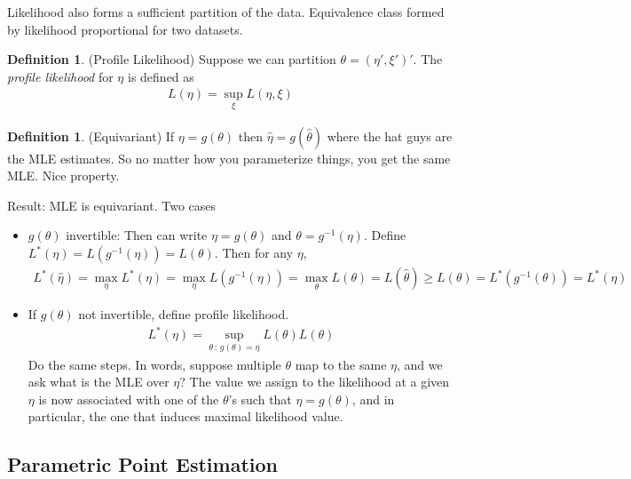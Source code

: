 \documentclass[12pt]{article}
\theoremstyle{plain}
\theoremstyle{definition}
\newtheorem{defn}[thm]{Definition}
\theoremstyle{remark}
\begin{document}
Likelihood also forms a sufficient partition of the data.
Equivalence class formed by likelihood proportional for two datasets.


\begin{defn}
(Profile Likelihood)
Suppose we can partition $\theta=(\eta',\xi')'$.
The \emph{profile likelihood} for $\eta$ is defined as
\begin{align*}
  L(\eta) = \sup_\xi L(\eta,\xi)
\end{align*}
\end{defn}

\begin{defn}(Equivariant)
If $\eta=g(\theta)$ then $\hat{\eta}=g(\hat{\theta})$ where the hat
guys are the MLE estimates.
So no matter how you parameterize things, you get the same MLE. Nice
property.
\end{defn}


Result: MLE is equivariant.
Two cases
\begin{itemize}
  \item $g(\theta)$ invertible:
    Then can write $\eta=g(\theta)$ and $\theta=g^{-1}(\eta)$.
    Define $L^*(\eta)=L(g^{-1}(\eta))=L(\theta)$.
    Then for any $\eta$,
    \begin{align*}
      L^*(\hat{\eta})
      =
      \max_\eta
      L^*(\eta)
      =
      \max_\eta
      L(g^{-1}(\eta))
      =
      \max_\theta
      L(\theta)
      =
      L(\hat{\theta})
      \geq
      L(\theta)
      =
      L^*(g^{-1}(\theta))
      =
      L^*(\eta)
    \end{align*}
  \item If $g(\theta)$ not invertible, define
    profile likelihood.
    \begin{align*}
      L^*(\eta) =
      \sup_{\theta\,:\,g(\theta)=\eta}
      L(\theta)
      L(\theta)
    \end{align*}
    Do the same steps.
    In words, suppose multiple $\theta$ map to the same $\eta$, and we
    ask what is the MLE over $\eta$?
    The value we assign to the likelihood at a given $\eta$ is now
    associated with one of the $\theta$'s such that $\eta=g(\theta)$,
    and in particular, the one that induces maximal likelihood value.
\end{itemize}



\subsection{Parametric Point Estimation}
\end{document}
